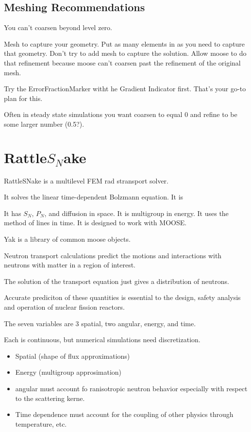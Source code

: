 \subsection{Meshing Recommendations}
You can't coarsen beyond level zero.

Mesh to capture your geometry. Put as many elements in as you need to capture 
that geometry. Don't try to add mesh to capture the solution. Allow moose to do 
that refinement because moose can't coarsen past the refinement of the original 
mesh.

Try the ErrorFractionMarker witht he Gradient Indicator first. That's your go-to 
plan for this.

Often in steady state simulations you want coarsen to equal 0 and refine to be 
some larger number (0.5?).


\section{Rattle$S_N$ake}

RattleSNake is a multilevel FEM rad stransport solver.

It solves the linear time-dependent Bolzmann equation. It is 

It has $S_N$, $P_N$, and diffusion in space. 
It is multigroup in energy. It uses the method of lines in time. 
It is designed to work with MOOSE. 


Yak is a library of common moose objects. 


Neutron transport calculations predict the motions and interactions with 
neutrons with matter in a region of interest.

The solution of the transport equation just gives a distribution of neutrons. 

Accurate prediciton of these quantities is essential to the design, safety 
analysis and operation of nuclear fission reactors.

The seven variables are 3 spatial, two angular, energy, and time. 

Each is continuous, but numerical simulations need discretization. 
\begin{itemize}
\item Spatial (shape of flux approximations)
\item Energy (multigroup approsimation)
\item angular must account fo ranisotropic neutron behavior especially with respect to 
the scattering kerne. 
\item Time dependence must account for the coupling of other physics through 
temperature, etc.
\end{itemize}




